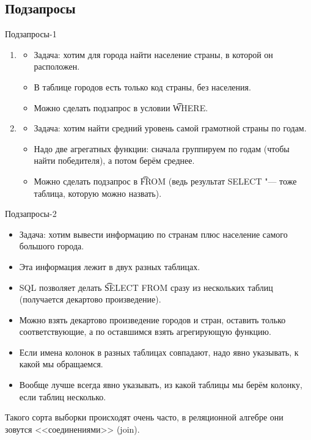 \subsection{Подзапросы}

\begin{frame}{Подзапросы-1}
	\begin{enumerate}
		\item
			\begin{itemize}
				\item Задача: хотим для города найти население страны, в которой он расположен.
				\item В таблице городов есть только код страны, без населения.
				\item Можно сделать подзапрос в условии \t{WHERE}.
			\end{itemize}
		\item
			\begin{itemize}
				\item Задача: хотим найти средний уровень самой грамотной страны по годам.
				\item Надо две агрегатных функции: сначала группируем по годам (чтобы найти победителя), а потом берём среднее.
				\item Можно сделать подзапрос в \t{FROM} (ведь результат SELECT "--- тоже таблица, которую можно назвать).
			\end{itemize}
	\end{enumerate}
\end{frame}

\begin{frame}{Подзапросы-2}
	\begin{itemize}
		\item Задача: хотим вывести информацию по странам плюс население самого большого города.
		\item Эта информация лежит в двух разных таблицах.
		\item SQL позволяет делать \t{SELECT FROM} сразу из нескольких таблиц (получается декартово произведение).
		\item Можно взять декартово произведение городов и стран, оставить только соответствующие, а по оставшимся взять агрегирующую функцию.
		\item Если имена колонок в разных таблицах совпадают, надо явно указывать, к какой мы обращаемся.
		\item Вообще лучше всегда явно указывать, из какой таблицы мы берём колонку, если таблиц несколько.
	\end{itemize}
	Такого сорта выборки происходят очень часто, в реляционной алгебре они зовутся <<соединениями>> (join).
\end{frame}

